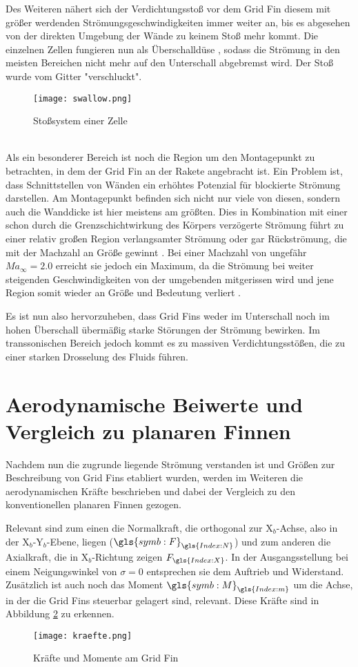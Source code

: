 Des Weiteren nähert sich der Verdichtungsstoß vor dem Grid Fin diesem mit größer werdenden Strömungsgeschwindigkeiten immer weiter an, bis es abgesehen von der direkten Umgebung der Wände zu keinem Stoß mehr kommt. Die einzelnen Zellen fungieren nun als Überschalldüse \cite{stroemung}, sodass die Strömung in den meisten Bereichen nicht mehr auf den Unterschall abgebremst wird. Der Stoß wurde vom Gitter "verschluckt".
\begin{figure}[h]
	\centering
	\texttt{[image: swallow.png]}
	\begin{flushright}
	\end{flushright}
	\caption{Stoßsystem einer Zelle}
	\label{abb_stoesse}
\end{figure}\\
Als ein besonderer Bereich ist noch die Region um den Montagepunkt zu betrachten, in dem der Grid Fin an der Rakete angebracht ist. Ein Problem ist, dass Schnittstellen von Wänden ein erhöhtes Potenzial für blockierte Strömung darstellen. Am Montagepunkt befinden sich nicht nur viele von diesen, sondern auch die Wanddicke ist hier meistens am größten. Dies in Kombination mit einer schon durch die Grenzschichtwirkung des Körpers verzögerte Strömung führt zu einer relativ großen Region verlangsamter Strömung oder gar Rückströmung, die mit der Machzahl an Größe gewinnt \cite{stroemung}. Bei einer Machzahl von ungefähr $Ma_\infty = 2.0$ erreicht sie jedoch ein Maximum, da die Strömung bei weiter steigenden Geschwindigkeiten von der umgebenden mitgerissen wird und jene Region somit wieder an Größe und Bedeutung verliert \cite{stroemung}.

Es ist nun also hervorzuheben, dass Grid Fins weder im Unterschall noch im hohen Überschall übermäßig starke Störungen der Strömung bewirken. Im transsonischen Bereich jedoch kommt es zu massiven Verdichtungsstößen, die zu einer starken Drosselung des Fluids führen.


\section{Aerodynamische Beiwerte und Vergleich zu planaren Finnen}
Nachdem nun die zugrunde liegende Strömung verstanden ist und Größen zur Beschreibung von Grid Fins etabliert wurden, werden im Weiteren die aerodynamischen Kräfte beschrieben und dabei der Vergleich zu den konventionellen planaren Finnen gezogen.

Relevant sind zum einen die Normalkraft, die orthogonal zur X$_b$-Achse, also in der X$_b$-Y$_b$-Ebene, liegen ($\gls{symb:F}_{\gls{Index:N}}$) und zum anderen die Axialkraft, die in X$_b$-Richtung zeigen $F_{\gls{Index:X}}$. In der Ausgangsstellung bei einem Neigungswinkel von $\sigma = 0$ entsprechen sie dem Auftrieb und Widerstand. Zusätzlich ist auch noch das Moment $\gls{symb:M}_{\gls{Index:m}}$ um die Achse, in der die Grid Fins steuerbar gelagert sind, relevant. Diese Kräfte sind in Abbildung \ref{abb_kraefte} zu erkennen.
\begin{figure}[h]
	\centering
	\texttt{[image: kraefte.png]}
	\caption{Kräfte und Momente am Grid Fin}
	\label{abb_kraefte}
\end{figure}\\
